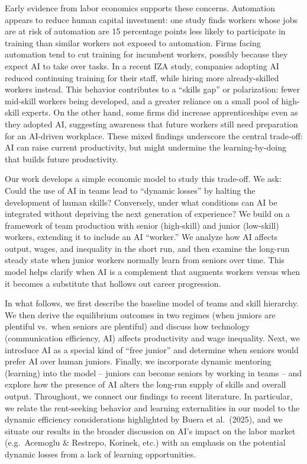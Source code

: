 \documentclass[12pt]{article}
\begin{document}
Early evidence from labor economics supports these concerns.
{Automation appears to reduce human capital investment:} one
study finds workers whose jobs are at risk of automation are {15
percentage points less likely to participate in training} than similar
workers not exposed to automation. Firms facing automation tend to
{cut training for incumbent workers}, possibly because they
expect AI to take over tasks. In a recent IZA study, companies adopting
AI reduced continuing training for their staff, while hiring more
already-skilled workers instead. This behavior contributes to a
{``skills gap''} or polarization: fewer mid-skill workers being
developed, and a greater reliance on a small pool of high-skill experts.
On the other hand, some firms did increase {apprenticeships} even
as they adopted AI, suggesting awareness that {future workers still
need preparation for an AI-driven workplace}. These mixed findings
underscore the central trade-off: AI can raise current productivity, but
might undermine the {learning-by-doing} that builds future
productivity.

Our work develops a simple economic model to study this trade-off. We
ask: {Could the use of AI in teams lead to ``dynamic losses'' by
halting the development of human skills?} Conversely, under what
conditions can AI be integrated without depriving the next generation of
experience? We build on a framework of team production with
{senior (high-skill) and junior (low-skill) workers}, extending
it to include an AI ``worker.'' We analyze how AI affects output, wages,
and inequality in the short run, and then examine the long-run steady
state when junior workers normally learn from seniors over time. This
model helps clarify when AI is a complement that {augments
workers} versus when it becomes a substitute that {hollows out
career progression}.

In what follows, we first describe the baseline model of teams and skill
hierarchy. We then derive the equilibrium outcomes in two regimes (when
juniors are plentiful vs.~when seniors are plentiful) and discuss how
technology (communication efficiency, AI) affects productivity and wage
inequality. Next, we introduce AI as a special kind of ``free junior''
and determine when seniors would prefer AI over human juniors. Finally,
we incorporate {dynamic mentoring (learning)} into the model --
juniors can become seniors by working in teams -- and explore how the
presence of AI alters the long-run supply of skills and overall output.
Throughout, we connect our findings to recent literature. In particular,
we relate the {rent-seeking behavior and learning externalities}
in our model to the dynamic efficiency considerations highlighted by
Buera et al.~(2025), and we situate our results in the broader
discussion on AI's impact on the labor market (e.g.~Acemoglu \&
Restrepo, Korinek, etc.) with an emphasis on the potential {dynamic
losses from a lack of learning opportunities}.
\end{document}
